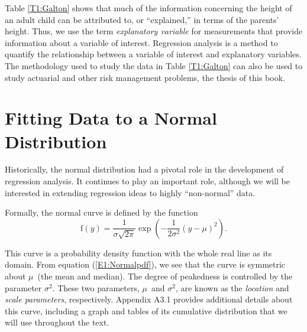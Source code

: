 

Table \ref{T1:Galton} shows that much of the information concerning
the height of an adult child can be attributed to, or ``explained,''
in terms of the parents' height. Thus, we use the term
\emph{explanatory variable} for measurements that provide
information about a variable of interest. Regression analysis is a
method to quantify the relationship between a variable of interest
and explanatory variables. The methodology used to study the data in
Table \ref{T1:Galton} can also be used to study actuarial and other
risk management problems, the thesis of this book.

\section{Fitting Data to a Normal
Distribution}

Historically, the normal distribution had a pivotal role in the
development of regression analysis. It continues to play an
important role, although we will be interested in extending
regression ideas to highly ``non-normal'' data.

Formally, the normal curve is defined by the function
\begin{equation}\label{E1:Normalpdf}
\mathrm{f}(y)=\frac{1}{\sigma \sqrt{2\pi }}\exp \left( -\frac{1}{2\sigma ^{2}%
}\left( y-\mu \right) ^{2}\right) .
\end{equation}

\noindent This curve is a probability density function with the
whole real line as its domain. From equation (\ref{E1:Normalpdf}),
we see that the curve is symmetric about $\mu $\ (the mean and
median). The degree of peakedness is controlled by the parameter
$\sigma ^{2}$. These two parameters, $\mu $\ and $\sigma ^{2}$, are
known as the \emph{location} and \emph{scale parameters},
respectively. Appendix A3.1 provides additional details about this
curve, including a graph and tables of its cumulative distribution
that we will use throughout the text.

